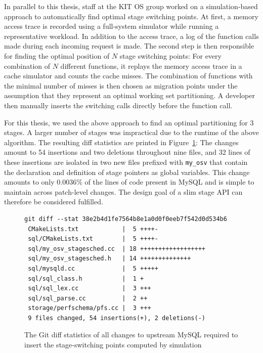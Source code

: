 \documentclass[12pt,a4paper]{book}
\begin{document}
In parallel to this thesis, staff at the KIT OS group worked on a simulation-based approach to automatically find optimal stage switching points.
At first, a memory access trace is recorded using a full-system simulator while running a representative workload.
In addition to the access trace, a log of the function calls made during each incoming request is made.
The second step is then responsible for finding the optimal position of $N$ stage switching points:
For every combination of $N$ different functions, it replays the memory access trace in a cache simulator and counts the cache misses.
The combination of functions with the minimal number of misses is then chosen as migration points under the assumption that they represent an optimal working set partitioning.
A developer then manually inserts the switching calls directly before the function call.~\cite{kitOSSFMA}

For this thesis, we used the above approach to find an optimal partitioning for 3 stages.
A larger number of stages was impractical due to the runtime of the above algorithm.
The resulting diff statistics are printed in Figure~\ref{fig:eval:api:diffstat}:
The changes amount to 54 insertions and two deletions throughout nine files, and 32 lines of these insertions are isolated in two new files prefixed with \texttt{my\_osv} that contain the declaration and definition of stage pointers as global variables.
This change amounts to only 0.0036\% of the lines of code present in MySQL and is simple to maintain across patch-level changes.
The design goal of a slim stage API can therefore be considered fulfilled.

\begin{figure}
\begin{lstlisting}[style=figurecpp]
git diff --stat 38e2b4d1fe7564b8e1a0d0f0eeb7f542d0d534b6
 CMakeLists.txt            |  5 ++++-
 sql/CMakeLists.txt        |  5 ++++-
 sql/my_osv_stagesched.cc  | 18 ++++++++++++++++++
 sql/my_osv_stagesched.h   | 14 ++++++++++++++
 sql/mysqld.cc             |  5 +++++
 sql/sql_class.h           |  1 +
 sql/sql_lex.cc            |  3 +++
 sql/sql_parse.cc          |  2 ++
 storage/perfschema/pfs.cc |  3 +++
 9 files changed, 54 insertions(+), 2 deletions(-)
\end{lstlisting}
\caption{The Git diff statistics of all changes to upstream MySQL required to insert the stage-switching points computed by simulation}
\label{fig:eval:api:diffstat}
\end{figure}
\end{document}
